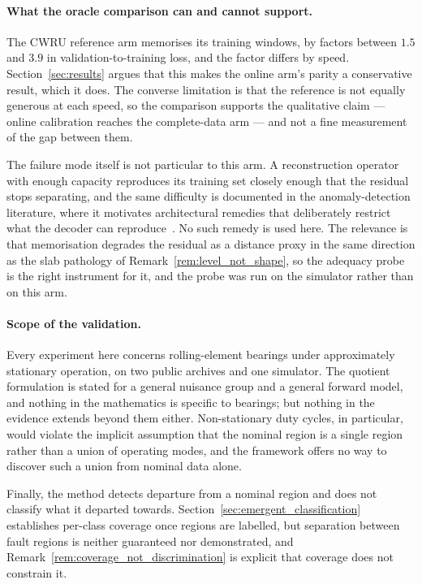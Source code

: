 \documentclass[a4paper]{cas-sc}
\begin{document}
\paragraph{What the oracle comparison can and cannot support.}
The CWRU reference arm memorises its training windows, by factors between
\(1.5\) and \(3.9\) in validation-to-training loss, and the factor differs by
speed. Section~\ref{sec:results} argues that this makes the online arm's
parity a conservative result, which it does. The converse limitation is that
the reference is not equally generous at each speed, so the comparison
supports the qualitative claim --- online calibration reaches the complete-data
arm --- and not a fine measurement of the gap between them.

The failure mode itself is not particular to this arm. A reconstruction
operator with enough capacity reproduces its training set closely enough that
the residual stops separating, and the same difficulty is documented in the
anomaly-detection literature, where it motivates architectural remedies that
deliberately restrict what the decoder can reproduce~\citep{gong2019memae}. No
such remedy is used here. The relevance is that memorisation degrades the
residual as a distance proxy in the same direction as the slab pathology of
Remark~\ref{rem:level_not_shape}, so the adequacy probe is the right
instrument for it, and the probe was run on the simulator rather than on this
arm.

\paragraph{Scope of the validation.}
Every experiment here concerns rolling-element bearings under approximately
stationary operation, on two public archives and one simulator. The quotient
formulation is stated for a general nuisance group and a general forward
model, and nothing in the mathematics is specific to bearings; but nothing in
the evidence extends beyond them either. Non-stationary duty cycles, in
particular, would violate the implicit assumption that the nominal region is a
single region rather than a union of operating modes, and the framework offers
no way to discover such a union from nominal data alone.

Finally, the method detects departure from a nominal region and does not
classify what it departed towards. Section~\ref{sec:emergent_classification}
establishes per-class coverage once regions are labelled, but separation
between fault regions is neither guaranteed nor demonstrated, and
Remark~\ref{rem:coverage_not_discrimination} is explicit that coverage does
not constrain it.
\end{document}
